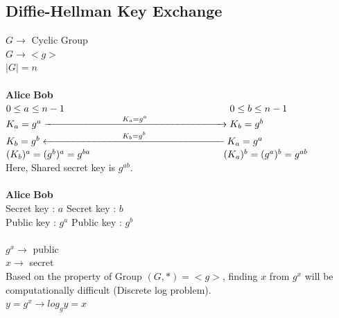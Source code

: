 \documentclass[11pt]{article}
\begin{document}
\subsection*{Diffie-Hellman Key Exchange}
$G \rightarrow $ Cyclic Group \\
$G \rightarrow  <g> $ \\
$|G| = n$ \\\\
\textbf{Alice} \hspace{7.5cm} \textbf{Bob} \\
$0 \leq a \leq n-1 \hspace*{6cm} 0 \leq b \leq n-1$ \\
$K_{a} = g^{a}\xrightarrow{\hspace*{2.75cm}K_{a} = g^{a}\hspace*{2.75cm}} K_{b} = g^{b} $\\
$K_{b} = g^{b}\xleftarrow{\hspace*{2.75cm}K_{b} = g^{b}\hspace*{2.75cm}} K_{a} = g^{a} $ \\
$(K_{b})^{a} = (g^{b})^{a} = g^{ba} \hspace*{4.85cm} (K_{a})^{b} = (g^{a})^{b} = g^{ab}$ \\
Here, Shared secret key is $g^{ab}$.\\
\\
\textbf{Alice} \hspace{7.5cm} \textbf{Bob} \\
Secret key : $a$ \hspace{6.2cm} Secret key : $b$ \\
Public key : $g^a$ \hspace{6cm} Public key : $g^b$ \\
\\
$g^x \rightarrow$ public \\
$x \rightarrow$ secret \\
Based on the property of Group $(G,*) = <g>$, finding $x$ from $g^x$  will be computationally difficult (Discrete log problem).\\
$y = g^x \rightarrow log_{g}y = x $\\
\\
\end{document}
